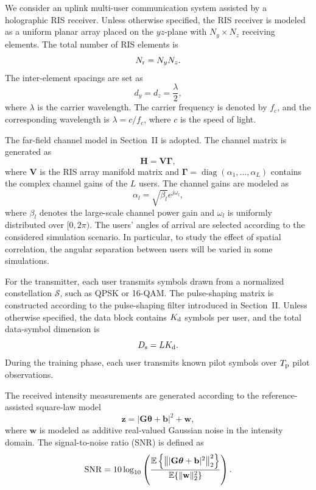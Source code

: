 \documentclass[journal]{IEEEtran}
\begin{document}
We consider an uplink multi-user communication system assisted by a holographic RIS receiver. 
Unless otherwise specified, the RIS receiver is modeled as a uniform planar array placed on the $yz$-plane with $N_y\times N_z$ receiving elements. 
The total number of RIS elements is
\begin{equation}
N_{\rm r}=N_yN_z.
\end{equation}
The inter-element spacings are set as
\begin{equation}
d_y=d_z=\frac{\lambda}{2},
\end{equation}
where $\lambda$ is the carrier wavelength. 
The carrier frequency is denoted by $f_c$, and the corresponding wavelength is $\lambda=c/f_c$, where $c$ is the speed of light.

The far-field channel model in Section~II is adopted. 
The channel matrix is generated as
\begin{equation}
\mathbf{H}
=
\mathbf{V}\boldsymbol{\Gamma},
\end{equation}
where $\mathbf{V}$ is the RIS array manifold matrix and $\boldsymbol{\Gamma}=\operatorname{diag}(\alpha_1,\ldots,\alpha_L)$ contains the complex channel gains of the $L$ users. 
The channel gains are modeled as
\begin{equation}
\alpha_l
=
\sqrt{\beta_l}e^{j\omega_l},
\end{equation}
where $\beta_l$ denotes the large-scale channel power gain and $\omega_l$ is uniformly distributed over $[0,2\pi)$. 
The users' angles of arrival are selected according to the considered simulation scenario. 
In particular, to study the effect of spatial correlation, the angular separation between users will be varied in some simulations.

For the transmitter, each user transmits symbols drawn from a normalized constellation $\mathcal{S}$, such as QPSK or 16-QAM. 
The pulse-shaping matrix is constructed according to the pulse-shaping filter introduced in Section~II. 
Unless otherwise specified, the data block contains $K_{\rm d}$ symbols per user, and the total data-symbol dimension is
\begin{equation}
D_{\rm s}=LK_{\rm d}.
\end{equation}
During the training phase, each user transmits known pilot symbols over $T_{\rm p}$ pilot observations.

The received intensity measurements are generated according to the reference-assisted square-law model
\begin{equation}
\mathbf{z}
=
\left|
\mathbf{G}\boldsymbol{\theta}
+
\mathbf{b}
\right|^2
+
\mathbf{w},
\end{equation}
where $\mathbf{w}$ is modeled as additive real-valued Gaussian noise in the intensity domain. 
The signal-to-noise ratio (SNR) is defined as
\begin{equation}
{\rm SNR}
=
10\log_{10}
\left(
\frac{
\mathbb{E}\left\{
\left\|
|\mathbf{G}\boldsymbol{\theta}+\mathbf{b}|^2
\right\|_2^2
\right\}
}{
\mathbb{E}\{\|\mathbf{w}\|_2^2\}
}
\right).
\label{eq:simulation_snr_definition}
\end{equation}
\end{document}
